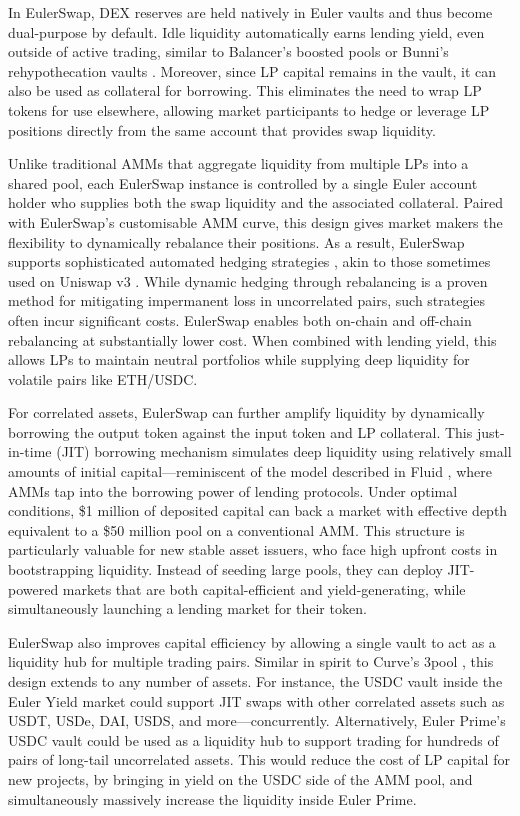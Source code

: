 \documentclass{article}
\begin{document}
In EulerSwap, DEX reserves are held natively in Euler vaults and thus become dual-purpose by default. Idle liquidity automatically earns lending yield, even outside of active trading, similar to Balancer’s boosted pools \cite{balancerBoosted} or Bunni’s rehypothecation vaults \cite{bunni2025}. Moreover, since LP capital remains in the vault, it can also be used as collateral for borrowing. This eliminates the need to wrap LP tokens for use elsewhere, allowing market participants to hedge or leverage LP positions directly from the same account that provides swap liquidity.

Unlike traditional AMMs that aggregate liquidity from multiple LPs into a shared pool, each EulerSwap instance is controlled by a single Euler account holder who supplies both the swap liquidity and the associated collateral. Paired with EulerSwap’s customisable AMM curve, this design gives market makers the flexibility to dynamically rebalance their positions. As a result, EulerSwap supports sophisticated automated hedging strategies \cite{atis2023dynamichedging}, akin to those sometimes used on Uniswap v3 \cite{adams2021uniswapv3}. While dynamic hedging through rebalancing is a proven method for mitigating impermanent loss in uncorrelated pairs, such strategies often incur significant costs. EulerSwap enables both on-chain and off-chain rebalancing at substantially lower cost. When combined with lending yield, this allows LPs to maintain neutral portfolios while supplying deep liquidity for volatile pairs like ETH/USDC.

For correlated assets, EulerSwap can further amplify liquidity by dynamically borrowing the output token against the input token and LP collateral. This just-in-time (JIT) borrowing mechanism simulates deep liquidity using relatively small amounts of initial capital—reminiscent of the model described in Fluid \cite{fluidWhitepaper}, where AMMs tap into the borrowing power of lending protocols. Under optimal conditions, \$1 million of deposited capital can back a market with effective depth equivalent to a \$50 million pool on a conventional AMM. This structure is particularly valuable for new stable asset issuers, who face high upfront costs in bootstrapping liquidity. Instead of seeding large pools, they can deploy JIT-powered markets that are both capital-efficient and yield-generating, while simultaneously launching a lending market for their token.

EulerSwap also improves capital efficiency by allowing a single vault to act as a liquidity hub for multiple trading pairs. Similar in spirit to Curve's 3pool \cite{curve3pool}, this design extends to any number of assets. For instance, the USDC vault inside the Euler Yield market could support JIT swaps with other correlated assets such as USDT, USDe, DAI, USDS, and more—concurrently. Alternatively, Euler Prime's USDC vault could be used as a liquidity hub to support trading for hundreds of pairs of long-tail uncorrelated assets. This would reduce the cost of LP capital for new projects, by bringing in yield on the USDC side of the AMM pool, and simultaneously massively increase the liquidity inside Euler Prime.
\end{document}
